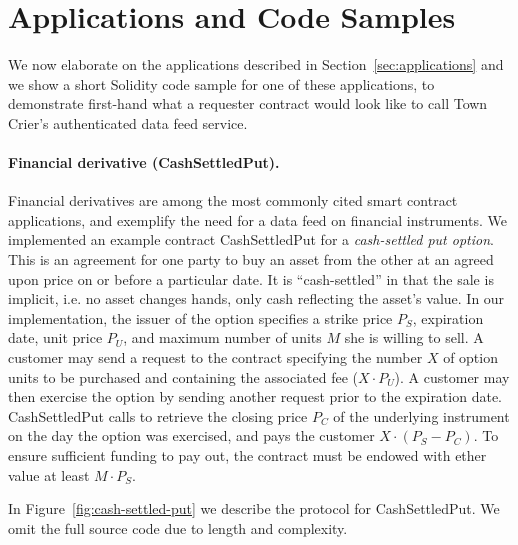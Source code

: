 \section{Applications and Code Samples}
\label{sec:applicationsfull}

We now elaborate 
on the applications described 
in Section~\ref{sec:applications}
and we show a short 
Solidity code sample for one of these applications,
to demonstrate first-hand what a requester  
contract would look like 
to call Town Crier's authenticated data feed service.


\paragraph{Financial derivative ({\sf CashSettledPut}).}
Financial derivatives are among the most commonly cited smart contract
applications,
and exemplify the need for a data feed on financial instruments.
We implemented an example contract {\sf CashSettledPut} for a {\em cash-settled put option}.
This is an agreement for one party to buy an asset from the other at an agreed upon price on or before a particular date.
It is ``cash-settled'' in that the sale is implicit, i.e. no asset changes hands, only cash reflecting the asset's value.
In our implementation, the issuer of the option specifies a strike price $P_S$, expiration date, unit price $P_U$, and maximum number of units $M$ she is willing to sell.
A customer may send a request to the contract specifying the number $X$ of option units to be purchased and containing the associated fee ($X \cdot P_U$).
A customer may then exercise the option by sending another request prior to the expiration date.
{\sf CashSettledPut} calls \tc to retrieve the closing price $P_C$ of the underlying instrument on the day the option was exercised, and pays the customer $X \cdot (P_S - P_C)$.
To ensure sufficient funding to pay out, the contract must be endowed with ether value at least $M \cdot P_S$.

In Figure~\ref{fig:cash-settled-put} we describe the protocol for {\sf CashSettledPut}.
We omit the full source code due to length and complexity.

